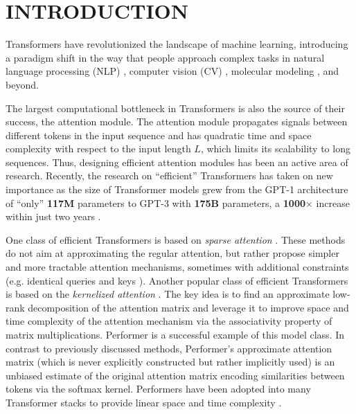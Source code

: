 \vspace{-2mm}
\section{INTRODUCTION}
\label{sec:intro}

Transformers have revolutionized the landscape of machine learning, introducing a paradigm shift in the way that people approach complex tasks in natural language processing (NLP) \cite{devlin}, computer vision (CV) \cite{vits}, molecular modeling \cite{jumper2021highly}, and beyond. 

The largest computational bottleneck in Transformers is also the source of their success, the attention module. The attention module propagates signals between different tokens in the input sequence and has quadratic time and space complexity with respect to the input length $L$, which limits its scalability to long sequences. Thus, designing efficient attention modules has been an active area of research. Recently, the research on ``efficient'' Transformers has taken on new importance as the size of Transformer models grew from the GPT-1 architecture of ``only'' \textbf{117M} parameters to GPT-3 with \textbf{175B} parameters, a \textbf{1000$\times$} increase within just two years \cite{gpt3}. 

One class of efficient Transformers is based on \textit{sparse attention} \cite{li2019enhancing, local-attention,zaheer2020big,routing, apoorv, reformer, sparse-hash}. 
These methods do not aim at approximating the regular attention, but rather propose simpler and more tractable attention mechanisms, sometimes with additional constraints (e.g. identical queries and keys \cite{reformer}). Another popular class of efficient Transformers is based on the \textit{kernelized attention} \cite{choromanski,tsai2019transformer,katharopoulos2020transformers}. The key idea is to find an approximate low-rank decomposition of the attention matrix and leverage it to improve space and time complexity of the attention mechanism via the associativity property of matrix multiplications. Performer \cite{choromanski} is a successful example of this model class. In contrast to previously discussed methods, Performer's approximate attention matrix (which is never explicitly constructed but rather implicitly used) is an unbiased estimate of the original attention matrix encoding similarities between tokens via the softmax kernel. Performers have been adopted into many Transformer stacks to provide linear space and time complexity \cite{perf-vit-1, perf-vit-2, tay2021omninet,performer-mpc}.

